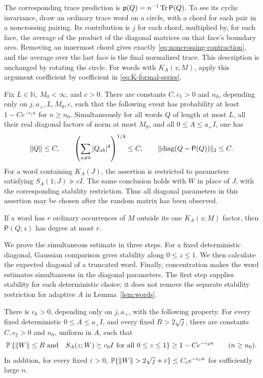 The corresponding trace prediction is
$\mathsf p(Q)=n^{-1}\operatorname{Tr}\mathsf P(Q)$.  To see its cyclic invariance,
draw an ordinary trace word on a circle, with a chord for each
pair in a noncrossing pairing.  Its contribution is $j$ for each chord,
multiplied by, for each face, the average of the product of the
diagonal matrices on that face's boundary arcs.  Removing an
innermost chord gives exactly \eqref{eq:noncrossing-contraction}, and
the average over the last face is the final normalized trace.  This
description is unchanged by rotating the circle.  For words with
$K_A(z;M)$, apply this argument coefficient by coefficient in
\eqref{eq:K-formal-series}.

\begin{lemma}\label{lem:words}
Fix $L\in\mathbb N$, $M_0<\infty$, and $c>0$.  There are constants
$C,c_1>0$ and $n_0$, depending only on $j,a_+,L,M_0,c$, such that the
following event has probability at least $1-Ce^{-c_1n}$ for
$n\ge n_0$.  Simultaneously for all words $Q$ of length at most $L$,
all their real diagonal factors of norm at most $M_0$, and all
$0\le A\le a_+I$, one has
\begin{equation}\label{eq:word-estimates}
 \lVert Q\rVert\le C,\qquad
 \left(\sum_{a\ne b}|Q_{ab}|^4\right)^{1/4}\le C,\qquad
 \lVert \operatorname{diag}(Q-\mathsf P(Q))\rVert_2\le C.
\end{equation}
For a word containing $K_A(J)$, the assertion is restricted to
parameters satisfying $S_A(1;J)\succeq cI$.  The same conclusion
holds with $W$ in place of $J$, with the corresponding stability
restriction.  Thus all diagonal parameters in this assertion may
be chosen after the random matrix has been observed.

If a word has $r$ ordinary occurrences of $M$ outside its one
$K_A(z;M)$ factor, then $\mathsf P(Q;z)$ has degree at most $r$.
\end{lemma}

We prove the simultaneous estimate in three steps.  For a fixed
deterministic diagonal, Gaussian comparison gives stability along
$0\le z\le1$.  We then calculate the expected diagonal of a
truncated word.  Finally, concentration makes the word estimates
simultaneous in the diagonal parameters.  The first step supplies
stability for each deterministic choice; it does not remove the
separate stability restriction for adaptive $A$ in
Lemma~\ref{lem:words}.

\begin{lemma}
\label{lem:matrix-path-stability}
There is $c_0>0$, depending only on $j,a_+$, with the following
property.  For every fixed deterministic $0\le A\le a_+I$, and every
fixed $R>2\sqrt j$, there are constants $C,c_2>0$ and $n_0$,
uniform in $A$, such that
\begin{equation}\label{eq:deterministic-path-stability}
 \mathbb P\left\{\lVert W\rVert\le R\ \hbox{and}\quad
 S_A(z;W)\succeq c_0I\text{ for all }0\le z\le1\right\}
 \ge1-Ce^{-c_2n}\qquad(n\ge n_0).
\end{equation}
In addition, for every fixed $\varepsilon>0$,
$\mathbb P\{\lVert W\rVert>2\sqrt j+\varepsilon\}\le
C_\varepsilon e^{-c_\varepsilon n}$ for sufficiently large $n$.
\end{lemma}

